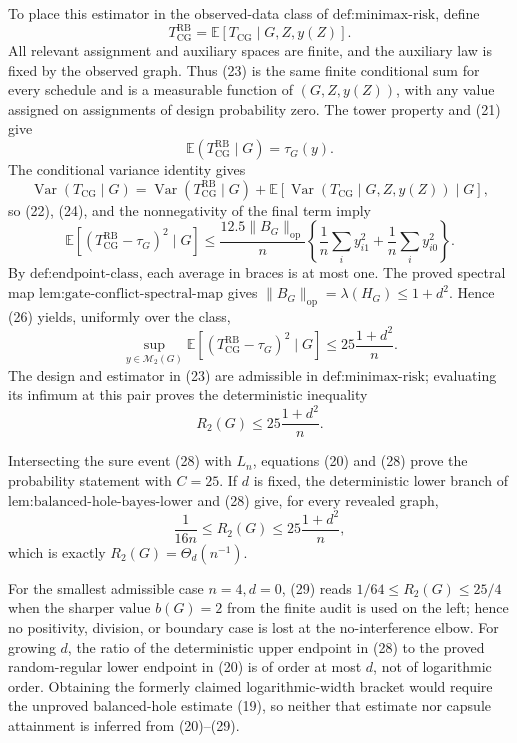 To place this estimator in the observed-data class of \(\text{def:minimax-risk}\), define
\[
T_{\mathrm{CG}}^{\mathrm{RB}}
=\mathbb E[T_{\mathrm{CG}}\mid G,Z,y(Z)]. \tag{23}
\]
All relevant assignment and auxiliary spaces are finite, and the auxiliary law is fixed by the observed graph.  Thus (23) is the same finite conditional sum for every schedule and is a measurable function of \((G,Z,y(Z))\), with any value assigned on assignments of design probability zero.  The tower property and (21) give
\[
\mathbb E(T_{\mathrm{CG}}^{\mathrm{RB}}\mid G)=\tau_G(y). \tag{24}
\]
The conditional variance identity gives
\[
\operatorname{Var}(T_{\mathrm{CG}}\mid G)
=\operatorname{Var}(T_{\mathrm{CG}}^{\mathrm{RB}}\mid G)
+\mathbb E[\operatorname{Var}(T_{\mathrm{CG}}\mid G,Z,y(Z))\mid G], \tag{25}
\]
so (22), (24), and the nonnegativity of the final term imply
\[
\mathbb E[(T_{\mathrm{CG}}^{\mathrm{RB}}-\tau_G)^2\mid G]
\le \frac{12.5\|B_G\|_{\mathrm{op}}}{n}
\left\{\frac1n\sum_i y_{i1}^2+
\frac1n\sum_i y_{i0}^2\right\}. \tag{26}
\]
By \(\text{def:endpoint-class}\), each average in braces is at most one.  The proved spectral map \(\text{lem:gate-conflict-spectral-map}\) gives \(\|B_G\|_{\mathrm{op}}=\lambda(H_G)\le1+d^2\).  Hence (26) yields, uniformly over the class,
\[
\sup_{y\in\mathcal M_2(G)}
\mathbb E[(T_{\mathrm{CG}}^{\mathrm{RB}}-\tau_G)^2\mid G]
\le25\frac{1+d^2}{n}. \tag{27}
\]
The design and estimator in (23) are admissible in \(\text{def:minimax-risk}\); evaluating its infimum at this pair proves the deterministic inequality
\[
R_2(G)\le25\frac{1+d^2}{n}. \tag{28}
\]

Intersecting the sure event (28) with \(L_n\), equations (20) and (28) prove the probability statement with \(C=25\).  If \(d\) is fixed, the deterministic lower branch of \(\text{lem:balanced-hole-bayes-lower}\) and (28) give, for every revealed graph,
\[
\frac1{16n}\le R_2(G)\le25\frac{1+d^2}{n}, \tag{29}
\]
which is exactly \(R_2(G)=\Theta_d(n^{-1})\).

For the smallest admissible case \(n=4,d=0\), (29) reads \(1/64\le R_2(G)\le25/4\) when the sharper value \(b(G)=2\) from the finite audit is used on the left; hence no positivity, division, or boundary case is lost at the no-interference elbow.  For growing \(d\), the ratio of the deterministic upper endpoint in (28) to the proved random-regular lower endpoint in (20) is of order at most \(d\), not of logarithmic order.  Obtaining the formerly claimed logarithmic-width bracket would require the unproved balanced-hole estimate (19), so neither that estimate nor capsule attainment is inferred from (20)--(29).
